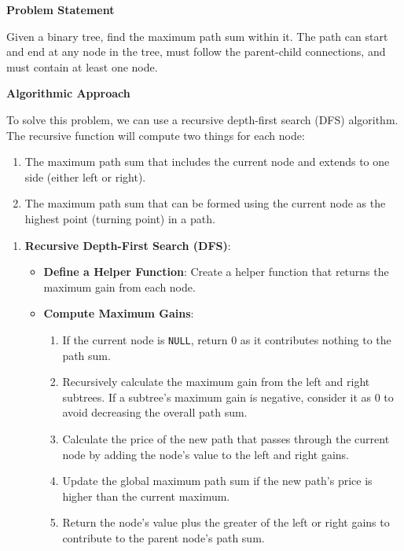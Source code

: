 

\textbf{Problem Statement}

Given a binary tree, find the maximum path sum within it. The path can start and end at any node in the tree, must follow the parent-child connections, and must contain at least one node.

\textbf{Algorithmic Approach}

To solve this problem, we can use a recursive depth-first search (DFS) algorithm. The recursive function will compute two things for each node:
\begin{enumerate}
    \item The maximum path sum that includes the current node and extends to one side (either left or right).
    \item The maximum path sum that can be formed using the current node as the highest point (turning point) in a path.
\end{enumerate}

\begin{enumerate}
    \item \textbf{Recursive Depth-First Search (DFS)}:
    \begin{itemize}
        \item \textbf{Define a Helper Function}: Create a helper function that returns the maximum gain from each node.
        \item \textbf{Compute Maximum Gains}:
        \begin{enumerate}
            \item If the current node is \texttt{NULL}, return 0 as it contributes nothing to the path sum.
            \item Recursively calculate the maximum gain from the left and right subtrees. If a subtree's maximum gain is negative, consider it as 0 to avoid decreasing the overall path sum.
            \item Calculate the price of the new path that passes through the current node by adding the node's value to the left and right gains.
            \item Update the global maximum path sum if the new path's price is higher than the current maximum.
            \item Return the node's value plus the greater of the left or right gains to contribute to the parent node's path sum.
        \end{enumerate}
    \end{itemize}
\end{enumerate}

